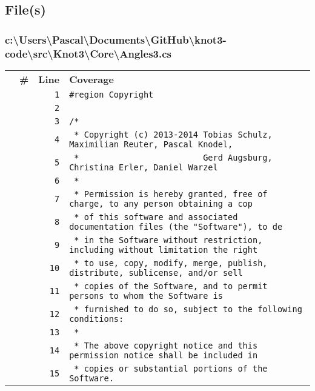 \documentclass[a4paper,10pt]{article}
\begin{document}
\subsection{File(s)}
\subsubsection{c:\textbackslash Users\textbackslash Pascal\textbackslash Documents\textbackslash GitHub\textbackslash knot3-code\textbackslash src\textbackslash Knot3\textbackslash Core\textbackslash Angles3.cs}
\begin{longtable}[l]{lrrl}
\textbf{} & \textbf{\#} & \textbf{Line} & \textbf{Coverage}\\
\cellcolor{gray} &  & \verb~1~ & \verb~#region Copyright~\\
\cellcolor{gray} &  & \verb~2~ & \verb~~\\
\cellcolor{gray} &  & \verb~3~ & \verb~/*~\\
\cellcolor{gray} &  & \verb~4~ & \verb~ * Copyright (c) 2013-2014 Tobias Schulz, Maximilian Reuter, Pascal Knodel,~\\
\cellcolor{gray} &  & \verb~5~ & \verb~ *                         Gerd Augsburg, Christina Erler, Daniel Warzel~\\
\cellcolor{gray} &  & \verb~6~ & \verb~ *~\\
\cellcolor{gray} &  & \verb~7~ & \verb~ * Permission is hereby granted, free of charge, to any person obtaining a cop~\\
\cellcolor{gray} &  & \verb~8~ & \verb~ * of this software and associated documentation files (the "Software"), to de~\\
\cellcolor{gray} &  & \verb~9~ & \verb~ * in the Software without restriction, including without limitation the right~\\
\cellcolor{gray} &  & \verb~10~ & \verb~ * to use, copy, modify, merge, publish, distribute, sublicense, and/or sell~\\
\cellcolor{gray} &  & \verb~11~ & \verb~ * copies of the Software, and to permit persons to whom the Software is~\\
\cellcolor{gray} &  & \verb~12~ & \verb~ * furnished to do so, subject to the following conditions:~\\
\cellcolor{gray} &  & \verb~13~ & \verb~ *~\\
\cellcolor{gray} &  & \verb~14~ & \verb~ * The above copyright notice and this permission notice shall be included in ~\\
\cellcolor{gray} &  & \verb~15~ & \verb~ * copies or substantial portions of the Software.~\\

\end{longtable}
\end{document}
